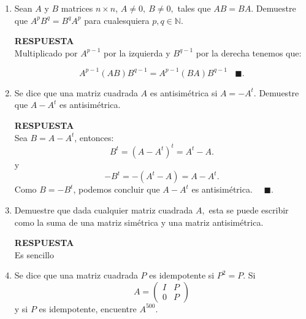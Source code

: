 \documentclass[11pt,letterpaper]{article}
\newcommand{\res}{\textbf{RESPUESTA}\\}
\newcommand{\fin}{$\blacksquare.$}
\newcommand{\finf}{\blacksquare.}
\begin{document}
\begin{enumerate}
\res
$\Rightarrow)$ Si $(A-B)(A+B)=A^2-B^2$ entonces:
\begin{equation*}
\begin{array}{ccc}
A^2-B^2&=&(A-B)(A+B)\\
&&\\
&=&AA-BA+AB-BB\\
&&\\
&=&A^2-BA+AB-B^2 \\
&&\\
BA&=&AB.
\end{array}
\end{equation*}
$\Leftarrow)$ Si $AB=AB$ entonces:
$$(A-B)(A+B)=AA-BA+AB-BB=A^2-B^2.$$
Por lo tanto, queda demostrado que $(A-B)(A+B)=A^2-B^2$ si y solo si $AB=BA.\ \ \finf$

\item Sean $A$ y $B$ matrices $n\times n$, $A\neq 0, \ B\neq 0,$ tales que $AB=BA.$ Demuestre que $A^pB^q=B^qA^p$ para cualesquiera $p,q\in \mathbb{N}.$

\res
Multiplicado por $A^{p-1}$ por la izquierda y $B^{q-1}$ por la derecha tenemos que:

$$A^{p-1}(AB)B^{q-1}=A^{p-1}(BA)B^{q-1} \ \ \ \ \finf$$


\item Se dice que una matriz cuadrada $A$ es antisimétrica si $A=-A^t.$ Demuestre que $A-A^t$ es antisimétrica.

\res
Sea $B=A-A^t$, entonces:
$$B^t=(A-A^t)^t=A^t-A.$$
y $$-B^t=-(A^t-A)=A-A^t.$$
Como $B=-B^t$, podemos concluir que   $A-A^t$ es antisimétrica. \ \ \fin

\item Demuestre que dada cualquier matriz cuadrada $A,$ esta se puede escribir como la suma de una matriz simétrica y una matriz antisimétrica.

\res
Es sencillo
\item Se dice que una matriz cuadrada $P$ es idempotente si $P^2=P$. Si 
\begin{equation*}
A=\left(\begin{array}{cc}
I& P\\
0&P
\end{array}
\right)
\end{equation*}
y si $P$ es idempotente, encuentre $A^{500}.$


\end{enumerate}
\end{document}
